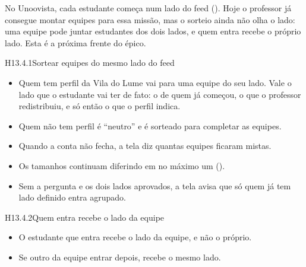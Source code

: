 
No Unoovista, cada estudante começa num lado do feed (). Hoje o
professor já consegue montar equipes para essa missão, mas o sorteio ainda não
olha o lado: uma equipe pode juntar estudantes dos dois lados, e quem entra
recebe o próprio lado. Esta é a próxima frente do épico.

\begin{historia}{H13.4.1}{Sortear equipes do mesmo lado do feed}{\pronto}
\aceite
\begin{itemize}
  \item Quem tem perfil da Vila do Lume vai para uma equipe do seu lado. Vale o
    lado que o estudante vai ter de fato: o de quem já começou, o que o
    professor redistribuiu, e só então o que o perfil indica.
  \item Quem não tem perfil é \enquote{neutro} e é sorteado para completar as
    equipes.
  \item Quando a conta não fecha, a tela diz quantas equipes ficaram mistas.
  \item Os tamanhos continuam diferindo em no máximo um ().
  \item Sem a pergunta e os dois lados aprovados, a tela avisa que só quem já
    tem lado definido entra agrupado.
\end{itemize}
\end{historia}

\begin{historia}{H13.4.2}{Quem entra recebe o lado da equipe}{\afazer}
\aceiteproposta
\begin{itemize}
  \item O estudante que entra recebe o lado da equipe, e não o próprio.
  \item Se outro da equipe entrar depois, recebe o mesmo lado.
\end{itemize}
\end{historia}

